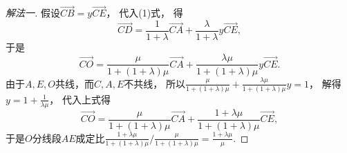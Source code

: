 \begin{example}
\begin{solution}
\begin{proof}[解法一]
假设\(\vec{CB} = y \vec{CE}\)，
代入(1)式，
得\begin{equation*}
	\vec{CD} = \frac{1}{1+\lambda} \vec{CA} + \frac{\lambda}{1+\lambda} y \vec{CE},
\end{equation*}
于是\begin{equation*}
	\vec{CO}
	= \frac{\mu}{1+(1+\lambda)\mu} \vec{CA}
	+ \frac{\lambda\mu}{1+(1+\lambda)\mu} y \vec{CE}.
\end{equation*}
由于\(A,E,O\)共线，而\(C,A,E\)不共线，
所以\(\frac{\mu}{1+(1+\lambda)\mu} + \frac{\lambda\mu}{1+(1+\lambda)\mu} y = 1\)，
解得\(y = 1 + \frac{1}{\lambda\mu}\)，
代入上式得\begin{equation*}
	\vec{CO}
	= \frac{\mu}{1+(1+\lambda)\mu} \vec{CA}
	+ \frac{1+\lambda\mu}{1+(1+\lambda)\mu} \vec{CE},
\end{equation*}
于是\(O\)分线段\(AE\)成定比\(
	\frac{1+\lambda\mu}{1+(1+\lambda)\mu}
	\bigg/
	\frac{\mu}{1+(1+\lambda)\mu}
	= \frac{1+\lambda\mu}{\mu}
\).


\end{proof}
\end{solution}
\end{example}
